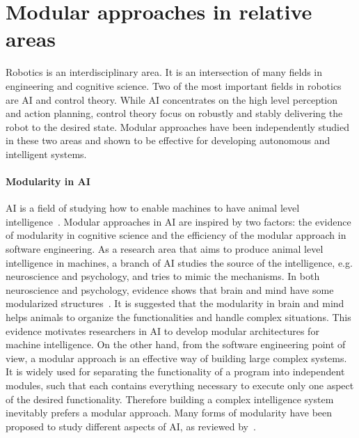 \section{Modular approaches in relative areas}
\label{cha1:modular}
Robotics is an interdisciplinary area. It is an intersection of many fields in engineering and cognitive science. Two of the most important fields in robotics are AI and control theory. While AI concentrates on the high level perception and action planning, control theory focus on robustly and stably delivering the robot to the desired state. Modular approaches have been independently studied in these two areas and shown to be effective for developing autonomous and intelligent systems.

\paragraph{Modularity in AI}
AI is a field of studying how to enable machines to have animal level intelligence~\citep{brooks1991intelligence}. Modular approaches in AI are inspired by two factors: the evidence of modularity in cognitive science and the efficiency of the modular approach in software engineering.
As a research area that aims to produce animal level intelligence in machines, a branch of AI studies the source of the intelligence, e.g. neuroscience and psychology, and tries to mimic the mechanisms. In both neuroscience and psychology, evidence shows that brain and mind have some modularized structures~\citep{fodor1983modularity,peretz2003modularity,barrett2006modularity,sztarker2011brain}. It is suggested that the modularity in brain and mind helps animals to organize the functionalities and handle complex situations. This evidence motivates researchers in AI to develop modular architectures for machine intelligence. On the other hand, from the software engineering point of view, a modular approach is an effective way of building large complex systems. It is widely used for separating the functionality of a program into independent modules, such that each contains everything necessary to execute only one aspect of the desired functionality. Therefore building a complex intelligence system inevitably prefers a modular approach. Many forms of modularity have been proposed to study different aspects of AI, as reviewed by~\citet{bryson2004modular}.


